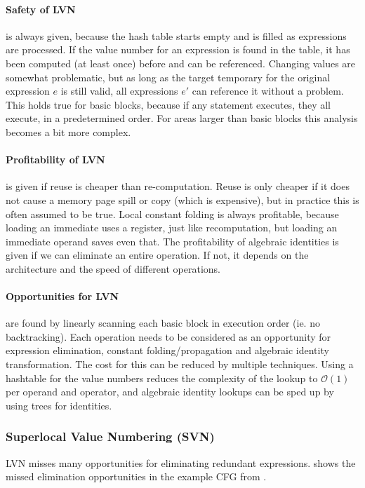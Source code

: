 \documentclass{article}
\begin{document}
\paragraph{Safety of LVN} is always given, because the hash table starts empty and is filled as expressions are processed.
If the value number for an expression is found in the table, it has been computed (at least once) before and can be referenced.
Changing values are somewhat problematic, but as long as the target temporary for the original expression $e$ is still valid, all expressions $e'$ can reference it without a problem.
This holds true for basic blocks, because if any statement executes, they all execute, in a predetermined order.
For areas larger than basic blocks this analysis becomes a bit more complex.

\paragraph{Profitability of LVN} is given if reuse is cheaper than re-computation.
Reuse is only cheaper if it does not cause a memory page spill or copy (which is expensive), but in practice this is often assumed to be true.
Local constant folding is always profitable, because loading an immediate uses a register, just like recomputation, but loading an immediate operand saves even that.
The profitability of algebraic identities is given if we can eliminate an entire operation.
If not, it depends on the architecture and the speed of different operations.

\paragraph{Opportunities for LVN} are found by linearly scanning each basic block in execution order (ie. no backtracking).
Each operation needs to be considered as an opportunity for expression elimination, constant folding/propagation and algebraic identity transformation.
The cost for this can be reduced by multiple techniques.
Using a hashtable for the value numbers reduces the complexity of the lookup to $\mathcal{O}(1)$ per operand and operator, and algebraic identity lookups can be sped up by using trees for identities.

\subsubsection{Superlocal Value Numbering (SVN)}
LVN misses many opportunities for eliminating redundant expressions.
 shows the missed elimination opportunities in the example CFG from .
\end{document}
